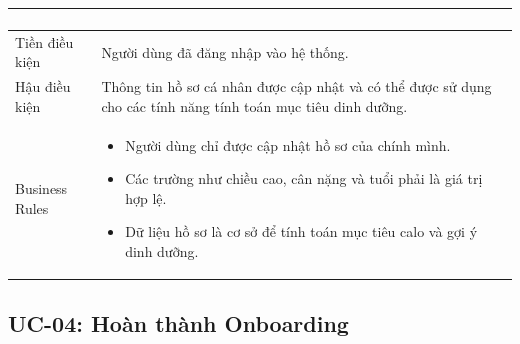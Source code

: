 \begin{longtable}{|p{4cm}|p{11cm}|}
\begin{enumerate}[nosep]
        \end{enumerate} \\
    \hline
    Tiền điều kiện & Người dùng đã đăng nhập vào hệ thống. \\
    \hline
    Hậu điều kiện & Thông tin hồ sơ cá nhân được cập nhật và có thể được sử dụng cho các tính năng tính toán mục tiêu dinh dưỡng. \\
    \hline
    Business Rules &
        \begin{itemize}[nosep]
            \item Người dùng chỉ được cập nhật hồ sơ của chính mình.
            \item Các trường như chiều cao, cân nặng và tuổi phải là giá trị hợp lệ.
            \item Dữ liệu hồ sơ là cơ sở để tính toán mục tiêu calo và gợi ý dinh dưỡng.
        \end{itemize} \\
    \hline
\end{longtable}


\subsection{UC-04: Hoàn thành Onboarding}

